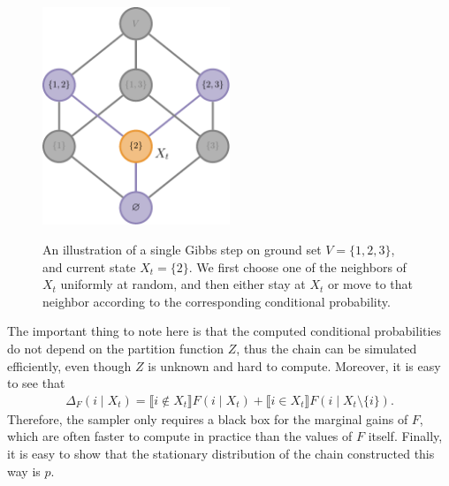 
\vspace{1em}
\begin{figure}[htbp]
\centering
\includegraphics[width=0.5\textwidth]{figures/gibbs/lattice_gibbs_2.pdf}\\[1em]
\caption{An illustration of a single Gibbs step on ground set $V = \{1, 2, 3\}$, and current state $X_t = \{2\}$.
We first choose one of the neighbors of $X_t$ uniformly at random, and then either stay at $X_t$ or move to that neighbor according to the corresponding conditional probability.}
\label{fig:gibbs}
\end{figure}

The important thing to note here is that the computed conditional probabilities do not depend on the partition function $Z$, thus the chain can be simulated efficiently, even though $Z$ is unknown and hard to compute.
Moreover, it is easy to see that
\begin{align*}
\Delta_F(i \mid X_t) = \llbracket i\not\in X_t\rrbracket F(i \mid X_t) + \llbracket i\in X_t\rrbracket F(i \mid X_t\setminus\{i\}).
\end{align*}
Therefore, the sampler only requires a black box for the marginal gains of $F$, which are often faster to compute in practice than the values of $F$ itself.
Finally, it is easy to show that the stationary distribution of the chain constructed this way is $p$.

